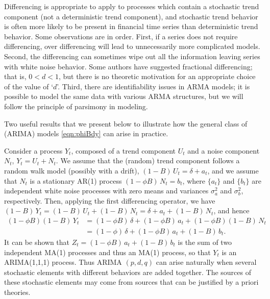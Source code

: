 Differencing is appropriate to apply to processes which contain a stochastic trend component (not a deterministic trend component), and stochastic trend behavior is often more likely to be present in financial time series than deterministic trend behavior. Some observations are in order. First, if a series does not require differencing, over differencing will lead to unnecessarily more complicated models. Second, the differencing can sometimes wipe out all the information leaving series with white noise behavior. Some authors have suggested fractional differencing; that is, $0<d<1$, but there is no theoretic motivation for an appropriate choice of the value of `$d$'. Third, there are identifiability issues in ARMA models; it is possible to model the same data with various ARMA structures, but we will follow the principle of parsimony in modeling. 


Two useful results that we present below to illustrate how the general class of (ARIMA) models \eqref{eqn:phiBdy} can arise in practice.


\begin{result}[Aggregation]
Consider a process $Y_t$, composed of a trend component $U_t$ and a noise component $N_t$, $Y_t = U_t + N_t$. We assume that the (random) trend component follows a random walk model (possibly with a drift), $(1 - B)\, U_t = \delta + a_t$, and we assume that $N_t$ is a stationary AR(1) process $(1 - \phi B)\, N_t = b_t$, where $\{ a_t \}$ and $\{ b_t \}$ are independent white noise processes with zero means and variances $\sigma_a^2$ and $\sigma_b^2$, respectively. Then, applying the first differencing operator, we have $(1 - B)\, Y_t = (1 - B)\, U_t + (1 - B)\, N_t = \delta + a_t + (1 - B)\, N_t$, and hence
	\begin{equation} \label{eqn:bphi}
	\begin{split}
	(1 - \phi B)(1 - B)\,Y_t&= (1 - \phi B)\, \delta + (1 - \phi B)\, a_t + (1 - \phi B)(1 - B)\, N_t \\
	&= (1 - \phi)\, \delta + (1 - \phi B)\, a_t + (1 - B)\, b_t.
	\end{split}
	\end{equation}
It can be shown that $Z_t = (1 - \phi B)\, a_t + (1 - B)\, b_t$ is the sum of two independent MA(1) processes and thus an MA(1) process, so that $Y_t$ is an ARIMA(1,1,1) process. Thus ARIMA $(p, d, q)$ can arise naturally when several stochastic elements with different behaviors are added together. The sources of these stochastic elements may come from sources that can be justified by a priori theories. \xqed
\end{result}


